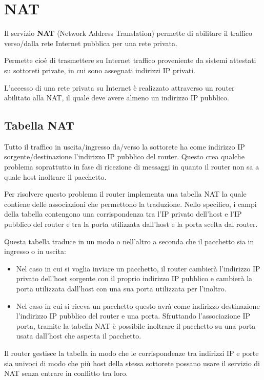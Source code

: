 \section{NAT}
Il servizio \textbf{NAT} (Network Address Translation) permette di 
abilitare il traffico verso/dalla rete Internet pubblica per una rete
privata.

Permette cioè di trasmettere su Internet traffico proveniente da 
sistemi attestati su sottoreti private, in cui sono assegnati indirizzi
IP privati.

L'accesso di una rete privata su Internet è realizzato attraverso un 
router abilitato alla NAT, il quale deve avere almeno un indirizzo IP
pubblico.

\subsection{Tabella NAT}
Tutto il traffico in uscita/ingresso da/verso la sottorete ha come
indirizzo IP sorgente/destinazione l'indirizzo IP pubblico del router.
Questo crea qualche problema soprattutto in fase di ricezione di
messaggi in quanto il router non sa a quale host inoltrare il
pacchetto.

Per risolvere questo problema il router implementa una tabella NAT la
quale contiene delle associazioni che permettono la traduzione. Nello
specifico, i campi della tabella contengono una corrispondenza tra
l'IP privato dell'host e l'IP pubblico del router e tra la porta
utilizzata dall'host e la porta scelta dal router.

Questa tabella traduce in un modo o nell'altro a seconda che il
pacchetto sia in ingresso o in uscita:
\begin{itemize}
	\item Nel caso in cui si voglia inviare un pacchetto, il router
		cambierà l'indirizzo IP privato dell'host sorgente con il
		proprio indirizzo IP pubblico e cambierà la porta utilizzata
		dall'host con una sua porta utilizzata per l'inoltro.
	\item Nel caso in cui si riceva un pacchetto questo avrà come
		indirizzo destinazione l'indirizzo IP pubblico del router 
		e una porta. Sfruttando l'associazione IP porta, tramite la
		tabella NAT è possibile inoltrare il pacchetto su una porta
		usata dall'host che aspetta il pacchetto.
\end{itemize}
Il router gestisce la tabella in modo che le corrispondenze tra
indirizzi IP e porte sia univoci di modo che più host della stessa
sottorete possano usare il servizio di NAT senza entrare in conflitto
tra loro.
